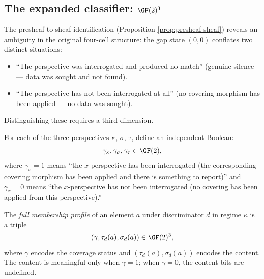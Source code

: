 \subsection{The expanded classifier: $\GF(2)^3$}
\label{sec:expanded}

The presheaf-to-sheaf identification (Proposition
\ref{prop:presheaf-sheaf}) reveals an ambiguity in the
original four-cell structure: the gap state $(0,0)$
conflates two distinct situations:
\begin{itemize}[nosep]
  \item ``The perspective was interrogated and produced no
    match'' (genuine silence --- data was sought and not
    found).
  \item ``The perspective has not been interrogated at all''
    (no covering morphism has been applied --- no data was
    sought).
\end{itemize}
Distinguishing these requires a third dimension.

\begin{definition}\label{def:coverage}
For each of the three perspectives $\kappa$, $\sigma$,
$\tau$, define an independent Boolean:
\[
  \gamma_\kappa, \gamma_\sigma, \gamma_\tau \in \GF(2),
\]
where $\gamma_x = 1$ means ``the $x$-perspective has been
interrogated (the corresponding covering morphism has been
applied and there is something to report)'' and
$\gamma_x = 0$ means ``the $x$-perspective has not been
interrogated (no covering has been applied from this
perspective).''

The \emph{full membership profile} of an element $a$
under discriminator $d$ in regime $\kappa$ is a triple
\begin{equation}
  (\gamma, \tau_d(a), \sigma_d(a)) \in \GF(2)^3,
\end{equation}
where $\gamma$ encodes the coverage status and
$(\tau_d(a), \sigma_d(a))$ encodes the content.
The content is meaningful only when $\gamma = 1$;
when $\gamma = 0$, the content bits are undefined.
\end{definition}

